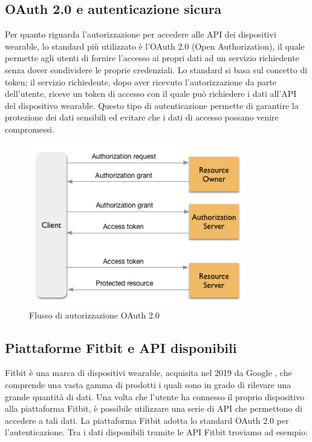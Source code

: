 \documentclass[12pt,a4paper,oneside]{report}
\begin{document}
\subsection{OAuth 2.0 e autenticazione sicura}
Per quanto riguarda l'autorizzazione per accedere alle API dei dispositivi wearable, lo standard più utilizzato è l'OAuth 2.0 (Open Authorization), il quale permette agli utenti di fornire l'accesso ai propri dati ad un servizio richiedente senza dover condividere le proprie credenziali.
Lo standard si basa sul concetto di token; il servizio richiedente, dopo aver ricevuto l'autorizzazione da parte dell'utente, riceve un token di accesso con il quale può richiedere i dati all'API del dispositivo wearable.
Questo tipo di autenticazione permette di garantire la protezione dei dati sensibili ed evitare che i dati di accesso possano venire compromessi.
\begin{figure}[H]
    \centering
    \includegraphics[width=0.85\textwidth]{images/oauth-abstract.png}
    \caption{Flusso di autorizzazione OAuth 2.0 \cite{oauth-image}}
    \label{fig:oauth-flow}
\end{figure}

\subsection{Piattaforme Fitbit e API disponibili}
Fitbit è una marca di dispositivi wearable, acquisita nel 2019 da Google \cite{fitbit}, che comprende una vasta gamma di prodotti i quali sono in grado di rilevare una grande quantità di dati.
Una volta che l'utente ha connesso il proprio dispositivo alla piattaforma Fitbit, è possibile utilizzare una serie di API che permettono di accedere a tali dati. La piattaforma Fitbit adotta lo standard OAuth 2.0 per l'autenticazione.
Tra i dati disponibili tramite le API Fitbit troviamo ad esempio:
\end{document}
